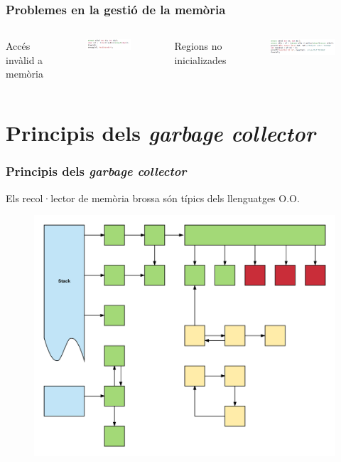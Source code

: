 \documentclass{beamer}
\newcommand{\newSectionFrame}[1]{\section{#1} \begin{frame}\frametitle{#1}}
\newcommand{\nextSectionFrame}[1]{\begin{frame}\frametitle{#1}}
\begin{document}
    \nextSectionFrame{Problemes en la gestió de la memòria}
        \begin{columns}
			Accés invàlid a memòria
			\begin{figure}
	            \includegraphics[width=\textwidth]{invalidAcc.png}			           
			\end{figure}

			Regions no inicializades
			\begin{figure}
	            \includegraphics[width=\textwidth]{NoInicialized.png}			
			\end{figure}

        \end{columns}
    \end{frame}

    \newSectionFrame{Principis dels \textit{garbage collector}}
		Els recol·lector de memòria brossa són típics dels llenguatges O.O.
		\begin{figure}
            \includegraphics[scale=0.1]{memory-objects-example.png}
        \end{figure}
    \end{frame}
    
\end{document}

